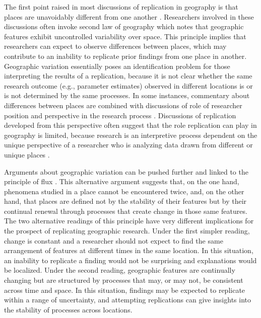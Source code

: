 \documentclass[]{interact}
\theoremstyle{plain}%
\theoremstyle{definition}
\theoremstyle{remark}
\begin{document}
The first point raised in most discussions of replication in geography is that places are unavoidably different from one another \citep[see][]{goodchild2021Annals, goodchild2022reproducibility, Wainwright2021}.
Researchers involved in these discussions often invoke \cite{anselin1989special} second law of geography which notes that geographic features exhibit uncontrolled variability over space. 
This principle implies that researchers can expect to observe differences between places, which may contribute to an inability to replicate prior findings from one place in another.
Geographic variation essentially poses an identification problem for those interpreting the results of a replication, because it is not clear whether the same research outcome (e.g., parameter estimates) observed in different locations is or is not determined by the same processes.  
In some instances, commentary about differences between places are combined  with discussions of role of researcher position and perspective in the research process \citep{Peet1999, simandan2019revisiting}. 
Discussions of replication developed from this perspective often suggest that the role replication can play in geography is limited, because research is an interpretive process dependent on the unique perspective of a researcher who is analyzing data drawn from different or unique places \citep{Wainwright2021}. 

Arguments about geographic variation can be pushed further and linked to the principle of flux \citep{marcovich1967}. 
This alternative argument suggests that, on the one hand, phenomena studied in a place cannot be encountered twice, and, on the other hand, that places are defined not by the stability of their features but by their continual renewal through processes that create change in those same features. 
The two alternative readings of this principle have very different implications for the prospect of replicating geographic research.
Under the first simpler reading, change is constant and a researcher should not expect to find the same arrangement of features at different times in the same location.
In this situation, an inability to replicate a finding would not be surprising and explanations would be localized. 
Under the second reading, geographic features are continually changing but are structured by processes that may, or may not, be consistent across time and space. 
In this situation, findings may be expected to replicate within a range of uncertainty, and attempting replications can give insights into the stability of processes across locations. 
\end{document}
